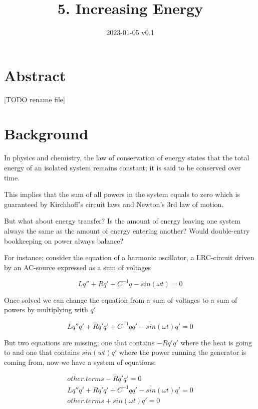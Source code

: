 \documentclass[]{elementary-physics}
\title{5. Increasing Energy}
\date{2023-01-05 v0.1}
\begin{document}
\maketitle

\tableofcontents

\section{Abstract}

[TODO rename file]

\section{Background}

In physics and chemistry, the law of conservation of energy\cite{energy} states that the total energy of an isolated system remains constant; it is said to be conserved over time.

This implies that the sum of all powers in the system equals to zero which is guaranteed by Kirchhoff's circuit laws\cite{Kirchhoff} and Newton's 3rd law of motion\cite{Newton}.

But what about energy transfer? Is the amount of energy leaving one system always the same as the amount of energy entering another? Would double-entry\cite{DoubleEntry} bookkeeping on power always balance?

For instance; consider the equation of a harmonic oscillator\cite{oscillator}, a LRC-circuit driven by an AC-source expressed as a sum of voltages

\begin{equation}
Lq'' + Rq' + C^{-1}q - sin(\omega t) = 0
\end{equation}

Once solved we can change the equation from a sum of voltages to a sum of powers by multiplying with $q'$

\begin{equation}
Lq''q' + Rq'q' + C^{-1}qq' - sin(\omega t)q' = 0
\end{equation}

But two equations are missing; one that contains $-Rq'q'$ where the heat is going to and one that contains $sin(wt)q'$ where the power running the generator is coming from, now we have a system of equations:


\begin{subequations}
\begin{align}
other.terms - Rq'q' = 0 \\
Lq''q' + Rq'q' + C^{-1}qq' - sin(\omega t)q' = 0 \\
other.terms + sin(\omega t)q' = 0
\end{align}
\end{subequations}
\end{document}
